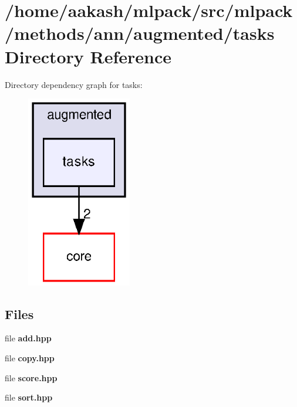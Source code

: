 \section{/home/aakash/mlpack/src/mlpack/methods/ann/augmented/tasks Directory Reference}
\label{dir_102d315f2032c86c92c3c308ed9ca334}
Directory dependency graph for tasks\+:
\nopagebreak
\begin{figure}[H]
\begin{center}
\leavevmode
\includegraphics[width=130pt]{dir_102d315f2032c86c92c3c308ed9ca334_dep}
\end{center}
\end{figure}
\subsection*{Files}
\begin{DoxyCompactItemize}
\item 
file \textbf{ add.\+hpp}
\item 
file \textbf{ copy.\+hpp}
\item 
file \textbf{ score.\+hpp}
\item 
file \textbf{ sort.\+hpp}
\end{DoxyCompactItemize}
